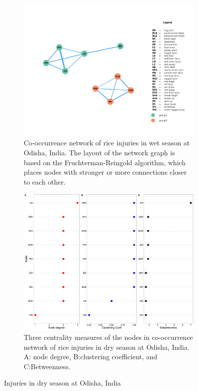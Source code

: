 \begin{figure}
    \centering
    \begin{subfigure}[b]{1\textwidth}
        \includegraphics[width = 1\textwidth]{figures/networkOR_ds/networkOR_ds.pdf}
        \caption{Co-occurrence network of rice injuries in wet season at Odisha, India. The layout of the network graph is based on the Fruchterman-Reingold algorithm, which places nodes with stronger or more connections closer to each other.}
        \label{fig:networkOR_ds}
    \end{subfigure}
    \begin{subfigure}[b]{1\textwidth}
        \includegraphics[width = 1\textwidth]{figures/nodepropOR_ds/nodepropOR_ds.pdf}
        \caption{Three centrality measures of the nodes in co-occurrence network of rice injuries in dry season at Odisha, India. A: node degree, B:clustering coefficient, and C:Betweenness.}
        \label{fig:nodepropOR_ds}
    \end{subfigure}
    \caption{Injuries in dry season at Odisha, India}
    \label{fig:OR_ds}
\end{figure}

